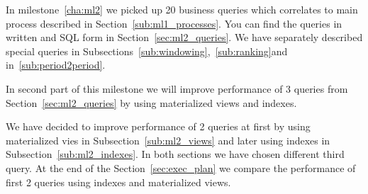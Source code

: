 
 In milestone~\ref{cha:ml2} we picked up 20 business queries which correlates to main process described in Section~\ref{sub:ml1_processes}. You can find the queries in written and SQL form in Section~\ref{sec:ml2_queries}. We have separately described special queries in Subsections~\ref{sub:windowing},~\ref{sub:ranking}and in~\ref{sub:period2period}.

In second part of this milestone we will improve performance of 3 queries from Section~\ref{sec:ml2_queries} by using materialized views and indexes.

We have decided to improve performance of 2 queries at first by using materialized vies in Subsection~\ref{sub:ml2_views}
and later using indexes in Subsection~\ref{sub:ml2_indexes}.
In both sections we have chosen different third query.
At the end of the Section~\ref{sec:exec_plan} we compare the performance of first 2 queries using indexes and materialized views.
 
